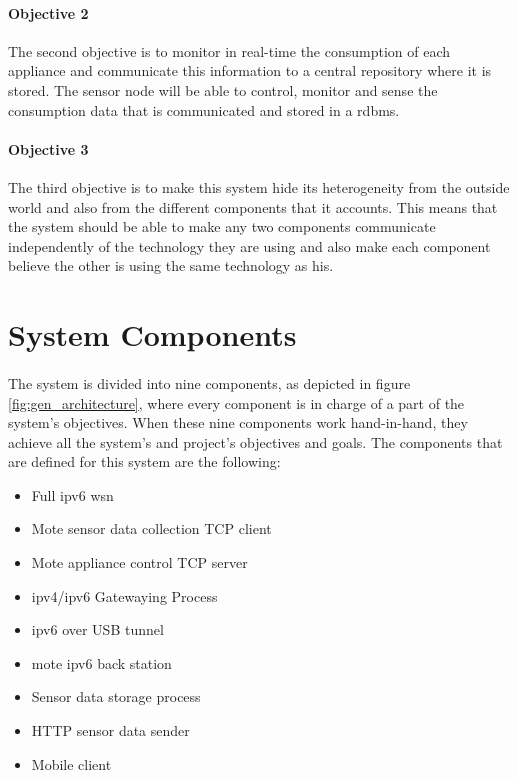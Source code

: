 \documentclass[oneside,12pt,a4paper,final]{book}
\begin{document}
\paragraph{Objective 2}
The second objective is to monitor in real-time the consumption of each appliance and communicate this information to a central repository where it is stored. The sensor node will be able to control, monitor and sense the consumption data that is communicated and stored in a \gls{rdbms}.
\paragraph{Objective 3}
The third objective is to make this system hide its heterogeneity from the outside world and also from the different components that it accounts. This means that the system should be able to make any two components communicate independently of the technology they are using and also make each component believe the other is using the same technology as his. 

\section{System Components}
\paragraph{}
The system is divided into nine components, as depicted in figure \ref{fig:gen_architecture}, where every component is in charge of a part of the system's objectives. When these nine components work hand-in-hand, they achieve all the system's and project's objectives and goals. The components that are defined for this system are the following:

\begin{itemize}
\item Full \gls{ipv6} \gls{wsn}
\item Mote sensor data collection TCP client
\item Mote appliance control TCP server
\item \gls{ipv4}/\gls{ipv6} Gatewaying Process
\item \gls{ipv6} over USB tunnel
\item mote \gls{ipv6} back station
\item Sensor data storage process
\item HTTP sensor data sender
\item Mobile client
\end{itemize}
\end{document}
